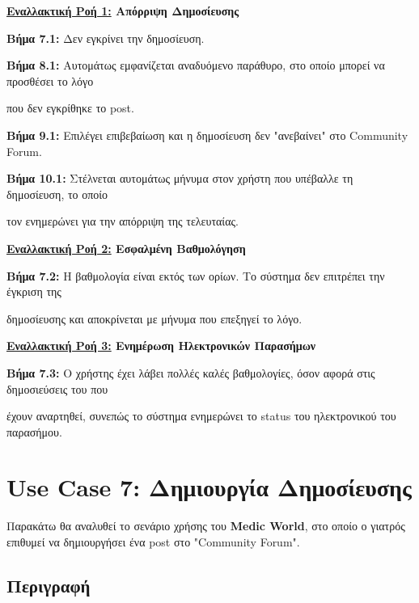 \documentclass{article}
\begin{document}
  \textbf{\underline{Εναλλακτική Ροή 1:} Απόρριψη Δημοσίευσης } \vspace{0.2cm}
\par \textbf{Βήμα 7.1:} Δεν εγκρίνει την δημοσίευση. \vspace{0.1cm}
\par \textbf{Βήμα 8.1:} Αυτομάτως εμφανίζεται αναδυόμενο παράθυρο, στο οποίο μπορεί να προσθέσει το λόγο \par που δεν εγκρίθηκε το post. \vspace{0.2cm}

\par \textbf{Βήμα 9.1:} Επιλέγει επιβεβαίωση και η δημοσίευση δεν "ανεβαίνει" στο Community Forum. \vspace{0.1cm}
\par \textbf{Βήμα 10.1:}  Στέλνεται αυτομάτως μήνυμα στον χρήστη που υπέβαλλε τη δημοσίευση, το οποίο \par τον ενημερώνει για την απόρριψη της τελευταίας. \vspace{0.2cm}

\textbf{\underline{Εναλλακτική Ροή 2:} Εσφαλμένη Βαθμολόγηση} \vspace{0.2cm}
\par \textbf{Βήμα 7.2:} Η βαθμολογία είναι εκτός των ορίων. Το σύστημα δεν επιτρέπει την έγκριση της \par δημοσίευσης και αποκρίνεται με μήνυμα που επεξηγεί το λόγο. \vspace{0.2cm}

\textbf{\underline{Εναλλακτική Ροή 3:} Ενημέρωση Ηλεκτρονικών Παρασήμων} \vspace{0.2cm}
\par \textbf{Βήμα 7.3:} Ο χρήστης έχει λάβει πολλές καλές βαθμολογίες, όσον αφορά στις δημοσιεύσεις του που \par έχουν αναρτηθεί, συνεπώς το σύστημα ενημερώνει το status του ηλεκτρονικού του παρασήμου.

\section{Use Case 7: Δημιουργία Δημοσίευσης}

Παρακάτω θα αναλυθεί το σενάριο χρήσης του \textbf{Medic World}, στο οποίο ο γιατρός επιθυμεί να δημιουργήσει ένα post στο "Community Forum".

\subsection{Περιγραφή}
\end{document}

